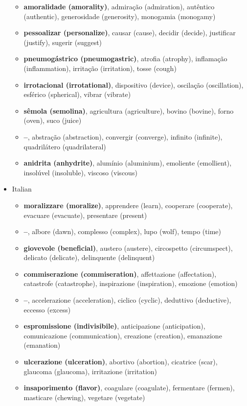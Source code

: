 \documentclass[output=paper]{langsci/langscibook}
\begin{document}
\begin{itemize}[leftmargin=*]
\begin{itemize}
		\item \textbf{amoralidade (amorality)}, admiração (admiration), autêntico (authentic), generosidade (generosity), monogamia (monogamy)
		\item \textbf{pessoalizar (personalize)}, causar (cause), decidir (decide), justificar (justify), sugerir (suggest)
		\item \textbf{pneumogástrico (pneumogastric)}, atrofia (atrophy), inflamação (inflammation), irritação (irritation), tosse (cough)
		\item \textbf{irrotacional (irrotational)}, dispositivo (device), oscilação (oscillation), esférico (spherical), vibrar (vibrate)
		\item \textbf{sêmola (semolina)}, agricultura (agriculture), bovino (bovine), forno (oven), suco (juice)
		\item \textbf{--}, abstração (abstraction), convergir (converge), infinito (infinite), qua\-drilátero (quadrilateral)
		\item \textbf{anidrita (anhydrite)}, alumínio (aluminium), emoliente (emollient), insolúvel (insoluble), viscoso (viscous)
	\end{itemize}
	\item Italian
	\begin{itemize}
		\item \textbf{moralizzare (moralize)}, apprendere (learn), cooperare (cooperate), evacuare (evacuate), presentare (present)
		\item \textbf{--}, albore (dawn), complesso (complex), lupo (wolf), tempo (time)
		\item \textbf{giovevole (beneficial)}, austero (austere), circospetto (circumspect), delicato (delicate), delinquente (delinquent)
		\item \textbf{commiserazione (commiseration)}, affettazione (affectation), catastrofe (catastrophe), inspirazione (inspiration), emozione (emotion)
		\item \textbf{--}, accelerazione (acceleration), ciclico (cyclic), deduttivo (deductive), eccesso (excess)
		\item \textbf{espromissione (indivisibile)}, anticipazione (anticipation), comunicazi\-o\-ne (communication), creazione (creation), emanazione (emanation)
		\item \textbf{ulcerazione (ulceration)}, abortivo (abortion), cicatrice (scar), glaucoma (glaucoma), irritazione (irritation)
		\item \textbf{insaporimento (flavor)}, coagulare (coagulate), fermentare (fermen), masticare (chewing), vegetare (vegetate)

\end{itemize}
\end{itemize}
\end{document}
